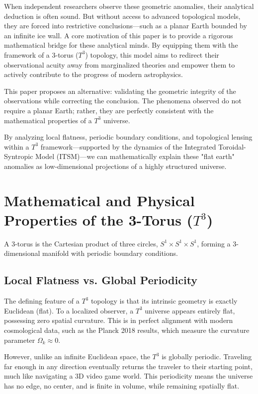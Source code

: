 \documentclass[aps,prd,11pt,onecolumn,superscriptaddress,nofootinbib,floatfix]{revtex4-2}
\begin{document}
When independent researchers observe these geometric anomalies, their analytical deduction is often sound. But without access to advanced topological models, they are forced into restrictive conclusions—such as a planar Earth bounded by an infinite ice wall. A core motivation of this paper is to provide a rigorous mathematical bridge for these analytical minds. By equipping them with the framework of a 3-torus ($T^3$) topology, this model aims to redirect their observational acuity away from marginalized theories and empower them to actively contribute to the progress of modern astrophysics.

This paper proposes an alternative: validating the geometric integrity of the observations while correcting the conclusion. The phenomena observed do not require a planar Earth; rather, they are perfectly consistent with the mathematical properties of a $T^3$ universe. 

By analyzing local flatness, periodic boundary conditions, and topological lensing within a $T^3$ framework—supported by the dynamics of the Integrated Toroidal-Syntropic Model (ITSM)—we can mathematically explain these "flat earth" anomalies as low-dimensional projections of a highly structured universe.

\section{Mathematical and Physical Properties of the 3-Torus ($T^3$)}
\label{sec:t3-properties}

A 3-torus is the Cartesian product of three circles, $S^1 \times S^1 \times S^1$, forming a 3-dimensional manifold with periodic boundary conditions.

\subsection{Local Flatness vs. Global Periodicity}
The defining feature of a $T^3$ topology is that its intrinsic geometry is exactly Euclidean (flat). To a localized observer, a $T^3$ universe appears entirely flat, possessing zero spatial curvature. This is in perfect alignment with modern cosmological data, such as the Planck 2018 results, which measure the curvature parameter $\Omega_k \approx 0$. 

However, unlike an infinite Euclidean space, the $T^3$ is globally periodic. Traveling far enough in any direction eventually returns the traveler to their starting point, much like navigating a 3D video game world. This periodicity means the universe has no edge, no center, and is finite in volume, while remaining spatially flat.
\end{document}
